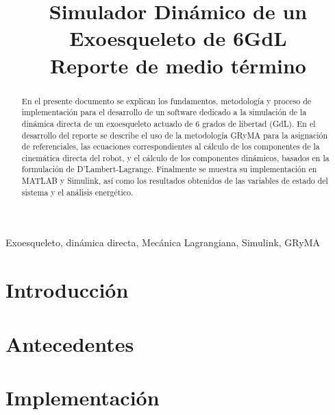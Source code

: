 \documentclass[journal]{IEEEtran}
\begin{document}
    \title{Simulador Dinámico de un Exoesqueleto de 6GdL\\
    \small{Reporte de medio término}}

    \author{
    }

    \maketitle

    \begin{abstract}
        En el presente documento se explican los fundamentos, metodología y proceso de implementación 
        para el desarrollo de un software dedicado a la simulación de la dinámica directa de un 
        exoesqueleto actuado de 6 grados de libertad (GdL). En el desarrollo del reporte se describe 
        el uso de la metodología GRyMA para la asignación de referenciales, las ecuaciones correspondientes 
        al cálculo de los componentes de la cinemática directa del robot, y el cálculo de los componentes 
        dinámicos, basados en la formulación de D'Lambert-Lagrange. Finalmente se muestra su implementación en 
        MATLAB y Simulink, así como los resultados obtenidos de las variables de estado del sistema y el análisis 
        energético.
    \end{abstract}

    \begin{IEEEkeywords}
    Exoesqueleto, dinámica directa, Mecánica Lagrangiana, Simulink, GRyMA
    \end{IEEEkeywords}

    \section{Introducción}
    

    \section{Antecedentes}

    
    


    \section{Implementación}
\end{document}
